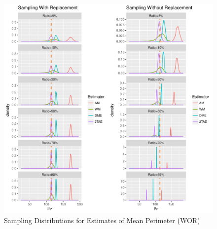 \documentclass{article}\usepackage[]{graphicx}\usepackage[]{color}
\makeatletter
\def\maxwidth{ %
  \ifdim\Gin@nat@width>\linewidth
    \linewidth
  \else
    \Gin@nat@width
  \fi
}
\newenvironment{knitrout}{}{} %
\numberwithin{figure}{subsection} %
\numberwithin{table}{subsection} %
\makeatother
\begin{document}
\begin{figure}[!htbp]
  \centering
\begin{knitrout}
\color{fgcolor}
\includegraphics[width=\maxwidth]{figure/unnamed-chunk-7-1} 

\end{knitrout}
\caption{Sampling Distributions for Estimates of Mean Perimeter (WOR)}
  \label{fig_dis_per_wor}
\end{figure}
\end{document}
